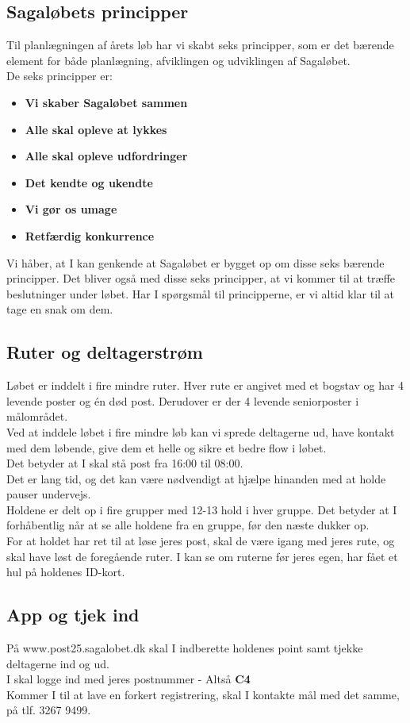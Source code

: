 \subsection{Sagaløbets principper}
Til planlægningen af årets løb har vi skabt seks principper, som er det bærende element for både planlægning, afviklingen og udviklingen af Sagaløbet.\\
De seks principper er:
\begin{itemize}
  \item \textbf{Vi skaber Sagaløbet sammen}
  \item \textbf{Alle skal opleve at lykkes}
  \item \textbf{Alle skal opleve udfordringer}
  \item \textbf{Det kendte og ukendte}
  \item \textbf{Vi gør os umage}
  \item \textbf{Retfærdig konkurrence}
\end{itemize}
Vi håber, at I kan genkende at Sagaløbet er bygget op om disse seks bærende principper. Det bliver også med disse seks principper, at vi kommer til at træffe beslutninger under løbet. Har I spørgsmål til principperne, er vi altid klar til at tage en snak om dem.
\subsection{Ruter og deltagerstrøm}
Løbet er inddelt i fire mindre ruter. Hver rute er angivet med et bogstav og har 4 levende poster og én død post. Derudover er der 4 levende seniorposter i målområdet.\\
Ved at inddele løbet i fire mindre løb kan vi sprede deltagerne ud, have kontakt med dem løbende, give dem et helle og sikre et bedre flow i løbet.\\
\newline
Det betyder at I skal stå post fra 16:00 til 08:00.\\
Det er lang tid, og det kan være nødvendigt at hjælpe hinanden med at holde pauser undervejs.\\
\newline
Holdene er delt op i fire grupper med 12-13 hold i hver gruppe. Det betyder at I forhåbentlig når at se alle holdene fra en gruppe, før den næste dukker op.\\
For at holdet har ret til at løse jeres post, skal de være igang med jeres rute, og skal have løst de foregående ruter. I kan se om ruterne før jeres egen, har fået et hul på holdenes ID-kort.
\subsection{App og tjek ind}
På www.post25.sagalobet.dk skal I indberette holdenes point samt tjekke deltagerne ind og ud.\\
I skal logge ind med jeres postnummer - Altså \textbf{C4}\\
\newline
Kommer I til at lave en forkert registrering, skal I kontakte mål med det samme, på tlf. 3267 9499.
\newpage
\vspace*{.4cm}
